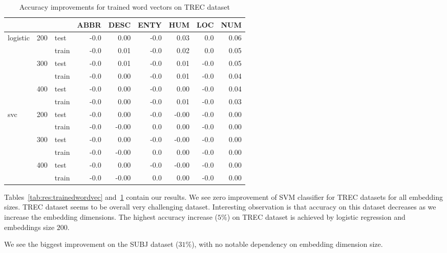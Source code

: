     \begin{table}[H]
    \begin{center}
    
    \begin{tabular}{lllrrrrrr}
    \toprule
     & &&ABBR &DESC &ENTY &HUM &LOC &NUM \\
    \midrule
    logistic & 200 & test &-0.0 &0.00 &-0.0 & 0.03 &0.0 & 0.06 \\
     & & train &-0.0 &0.01 &-0.0 & 0.02 &0.0 & 0.05 \\
     & 300 & test &-0.0 &0.01 &-0.0 & 0.01 & -0.0 & 0.05 \\
     & & train &-0.0 &0.00 &-0.0 & 0.01 & -0.0 & 0.04 \\
     & 400 & test &-0.0 &0.00 &-0.0 & 0.00 & -0.0 & 0.04 \\
     & & train &-0.0 &0.00 &-0.0 & 0.01 & -0.0 & 0.03 \\
    svc & 200 & test &-0.0 &0.00 &-0.0 &-0.00 & -0.0 & 0.00 \\
     & & train &-0.0 & -0.00 & 0.0 & 0.00 & -0.0 & 0.00 \\
     & 300 & test &-0.0 &0.00 &-0.0 &-0.00 & -0.0 & 0.00 \\
     & & train &-0.0 & -0.00 & 0.0 & 0.00 & -0.0 & 0.00 \\
     & 400 & test &-0.0 &0.00 &-0.0 &-0.00 & -0.0 & 0.00 \\
     & & train &-0.0 & -0.00 & 0.0 & 0.00 & -0.0 & 0.00 \\
    \bottomrule
    \end{tabular}
    
    \caption[Accuracy improvements for trained word vectors on TREC dataset]{Accuracy improvements for trained word vectors on TREC dataset}
    \label{tab:res:trainedwordvec:trec}
    \end{center}
    \end{table}


    Tables~\ref{tab:res:trainedwordvec} and~\ref{tab:res:trainedwordvec:trec} contain our results.
    We see zero improvement of SVM classifier for TREC datasets for all embedding sizes.
    TREC dataset seems to be overall very challenging dataset.
    Interesting observation is that accuracy on this dataset decreases as we increase the embedding dimensions.
    The highest accuracy increase ($5\%$) on TREC dataset is achieved by logistic regression and embeddings size $200$. 
    
    We see the biggest improvement on the SUBJ dataset ($31\%$), with no notable dependency on embedding dimension size.  
    
